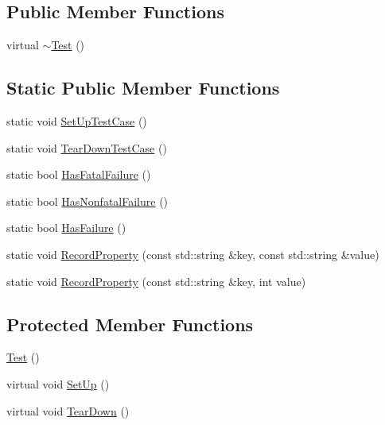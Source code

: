 \subsection*{Public Member Functions}
\begin{DoxyCompactItemize}
\item 
virtual \hyperlink{classtesting_1_1Test_a2b0a62f1e667bbe8d8cb18d785bfa991}{$\sim$\+Test} ()
\end{DoxyCompactItemize}
\subsection*{Static Public Member Functions}
\begin{DoxyCompactItemize}
\item 
static void \hyperlink{classtesting_1_1Test_a5ccbac42fee8c5b00b0bfe89b6c49d79}{Set\+Up\+Test\+Case} ()
\item 
static void \hyperlink{classtesting_1_1Test_af374706cbaf0ffc460f4fd04e7c150f1}{Tear\+Down\+Test\+Case} ()
\item 
static bool \hyperlink{classtesting_1_1Test_a5e83604628ef542af888d631566ff60c}{Has\+Fatal\+Failure} ()
\item 
static bool \hyperlink{classtesting_1_1Test_a8c00e8cc6fe10616b480bd54d2a426cb}{Has\+Nonfatal\+Failure} ()
\item 
static bool \hyperlink{classtesting_1_1Test_a7a00be7dd0a6bfdc8d47a1b784623613}{Has\+Failure} ()
\item 
static void \hyperlink{classtesting_1_1Test_a1559ce1c83f56993b582650c091535a7}{Record\+Property} (const std\+::string \&key, const std\+::string \&value)
\item 
static void \hyperlink{classtesting_1_1Test_a373da47b491b1e64e355d22d6ec99b5b}{Record\+Property} (const std\+::string \&key, int value)
\end{DoxyCompactItemize}
\subsection*{Protected Member Functions}
\begin{DoxyCompactItemize}
\item 
\hyperlink{classtesting_1_1Test_a99f2bbfac6c95612322b0f10e607ebe5}{Test} ()
\item 
virtual void \hyperlink{classtesting_1_1Test_a190315150c303ddf801313fd1a777733}{Set\+Up} ()
\item 
virtual void \hyperlink{classtesting_1_1Test_a5f0ab439802cbe0ef7552f1a9f791923}{Tear\+Down} ()
\end{DoxyCompactItemize}

